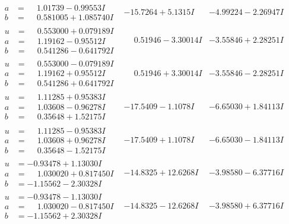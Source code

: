 \documentclass[1p]{elsarticle_modified}
\theoremstyle{definition}
\begin{document}
$$\begin{array}{c|c|c}
\begin{aligned}
a &= \phantom{-}1.01739 - 0.99553 I \\
b &= \phantom{-}0.581005 + 1.085740 I\end{aligned}
 & -15.7264 + 5.1315 I & -4.99224 - 2.26947 I \\ \hline\begin{aligned}
u &= \phantom{-}0.553000 + 0.079189 I \\
a &= \phantom{-}1.19162 - 0.95512 I \\
b &= \phantom{-}0.541286 - 0.641792 I\end{aligned}
 & \phantom{-}0.51946 - 3.30014 I & -3.55846 + 2.28251 I \\ \hline\begin{aligned}
u &= \phantom{-}0.553000 - 0.079189 I \\
a &= \phantom{-}1.19162 + 0.95512 I \\
b &= \phantom{-}0.541286 + 0.641792 I\end{aligned}
 & \phantom{-}0.51946 + 3.30014 I & -3.55846 - 2.28251 I \\ \hline\begin{aligned}
u &= \phantom{-}1.11285 + 0.95383 I \\
a &= \phantom{-}1.03608 - 0.96278 I \\
b &= \phantom{-}0.35648 + 1.52175 I\end{aligned}
 & -17.5409 - 1.1078 I & -6.65030 + 1.84113 I \\ \hline\begin{aligned}
u &= \phantom{-}1.11285 - 0.95383 I \\
a &= \phantom{-}1.03608 + 0.96278 I \\
b &= \phantom{-}0.35648 - 1.52175 I\end{aligned}
 & -17.5409 + 1.1078 I & -6.65030 - 1.84113 I \\ \hline\begin{aligned}
u &= -0.93478 + 1.13030 I \\
a &= \phantom{-}1.030020 + 0.817450 I \\
b &= -1.15562 - 2.30328 I\end{aligned}
 & -14.8325 + 12.6268 I & -3.98580 - 6.37716 I \\ \hline\begin{aligned}
u &= -0.93478 - 1.13030 I \\
a &= \phantom{-}1.030020 - 0.817450 I \\
b &= -1.15562 + 2.30328 I\end{aligned}
 & -14.8325 - 12.6268 I & -3.98580 + 6.37716 I\\

\end{array}$$
\end{document}
